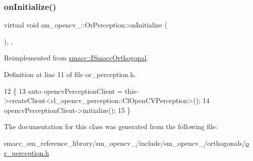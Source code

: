 \subsubsection{\texorpdfstring{on\+Initialize()}{onInitialize()}}
{\footnotesize\ttfamily virtual void sm\+\_\+opencv\+\_\+::\+Or\+Perception\+::on\+Initialize (\begin{DoxyParamCaption}{ }\end{DoxyParamCaption})\hspace{0.3cm}{\ttfamily [inline]}, {\ttfamily [override]}, {\ttfamily [virtual]}}



Reimplemented from \hyperlink{classsmacc_1_1ISmaccOrthogonal_a6bb31c620cb64dd7b8417f8705c79c7a}{smacc\+::\+I\+Smacc\+Orthogonal}.



Definition at line 11 of file or\+\_\+perception.\+h.


\begin{DoxyCode}
12   \{
13     \textcolor{keyword}{auto} opencvPerceptionClient = this->createClient<cl\_opencv\_perception::ClOpenCVPerception>();
14     opencvPerceptionClient->initialize();
15   \}
\end{DoxyCode}


The documentation for this class was generated from the following file\+:\begin{DoxyCompactItemize}
\item 
smacc\+\_\+sm\+\_\+reference\+\_\+library/sm\+\_\+opencv\+\_/include/sm\+\_\+opencv\+\_/orthogonals/\hyperlink{sm__opencv__3_2include_2sm__opencv__3_2orthogonals_2or__perception_8h}{or\+\_\+perception.\+h}\end{DoxyCompactItemize}
